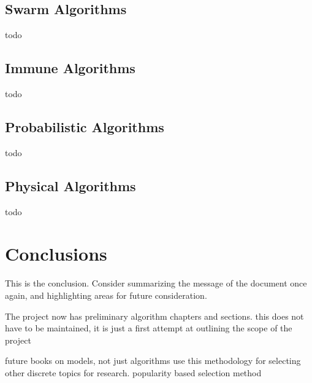 \documentclass[a4paper, 11pt]{article}
\begin{document}
\subsection{Swarm Algorithms}
todo

\subsection{Immune Algorithms}
todo

\subsection{Probabilistic Algorithms}
todo

\subsection{Physical Algorithms}
todo

% 
% 
\section{Conclusions}
\label{sec:conclusions}
This is the conclusion. Consider summarizing the message of the document once again, and highlighting areas for future consideration.

The project now has preliminary algorithm chapters and sections.
this does not have to be maintained, it is just a first attempt at outlining the scope of the project

future books on models, not just algorithms
use this methodology for selecting other discrete topics for research. popularity based selection method



\end{document}
